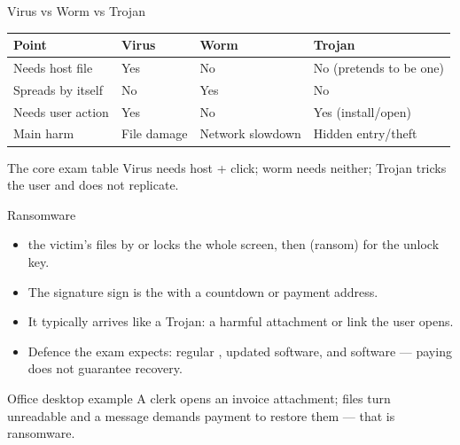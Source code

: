 \documentclass[aspectratio=169]{beamer}
\begin{document}
\begin{frame}{Virus vs Worm vs Trojan}
  \begin{center}
    \begin{tabular}{llll}
      \toprule
      \textbf{Point} & \textbf{Virus} & \textbf{Worm} & \textbf{Trojan} \\
      \midrule
      Needs host file & Yes & No & No (pretends to be one) \\
      Spreads by itself & No & Yes & No \\
      Needs user action & Yes & No & Yes (install/open) \\
      Main harm & File damage & Network slowdown & Hidden entry/theft \\
      \bottomrule
    \end{tabular}
  \end{center}
  \vspace{0.35cm}
  \begin{alertblock}{The core exam table}
    Virus needs host + click; worm needs neither; Trojan tricks the user and
    does not replicate.
  \end{alertblock}
\end{frame}

\begin{frame}{Ransomware}
  \begin{itemize}
    \item {}  the victim's files by
       or locks the whole screen, then 
      (ransom) for the unlock key.
    \item The signature sign is the  with a
      countdown or payment address.
    \item It typically arrives like a Trojan: a harmful attachment or link
      the user opens.
    \item Defence the exam expects: regular , updated
      software, and  software --- paying does not guarantee
      recovery.
  \end{itemize}
  \begin{exampleblock}{Office desktop example}
    A clerk opens an invoice attachment; files turn unreadable and a message
    demands payment to restore them --- that is ransomware.
  \end{exampleblock}
\end{frame}
\end{document}

